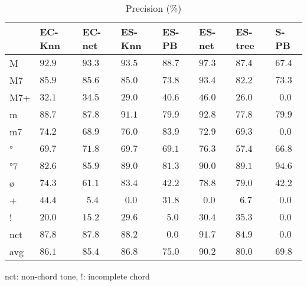 \documentclass{article}
\begin{document}
\begin{table}
  \centering
  \begin{tabular}{l|p{.5cm}p{.5cm}p{.5cm}p{.5cm}p{.5cm}p{.5cm}p{.5cm}}
   & EC-Knn&EC-net &ES-Knn &ES-PB  &ES-net &ES-tree&S-PB     \\
\hline                                             
M  &$ 92.9$&$ 93.3$&$ 93.5$&$ 88.7$&$ 97.3$&$ 87.4$&$ 67.4$  \\
M7 &$ 85.9$&$ 85.6$&$ 85.0$&$ 73.8$&$ 93.4$&$ 82.2$&$ 73.3$  \\
M7+&$ 32.1$&$ 34.5$&$ 29.0$&$ 40.6$&$ 46.0$&$ 26.0$&$~~0.0$  \\
m  &$ 88.7$&$ 87.8$&$ 91.1$&$ 79.9$&$ 92.8$&$ 77.8$&$ 79.9$  \\
m7 &$ 74.2$&$ 68.9$&$ 76.0$&$ 83.9$&$ 72.9$&$ 69.3$&$~~0.0$  \\
°  &$ 69.7$&$ 71.8$&$ 69.7$&$ 69.1$&$ 76.3$&$ 57.4$&$ 66.8$  \\
°7 &$ 82.6$&$ 85.9$&$ 89.0$&$ 81.3$&$ 90.0$&$ 89.1$&$ 94.6$  \\
ø  &$ 74.3$&$ 61.1$&$ 83.4$&$ 42.2$&$ 78.8$&$ 79.0$&$ 42.2$  \\
+  &$ 44.4$&$~~5.4$&$~~0.0$&$ 31.8$&$~~0.0$&$~~6.7$&$~~0.0$  \\
!  &$ 20.0$&$ 15.2$&$ 29.6$&$~~5.0$&$ 30.4$&$ 35.3$&$~~0.0$  \\
nct&$ 87.8$&$ 87.8$&$ 88.2$&$~~0.0$&$ 91.7$&$ 84.9$&$~~0.0$  \\
avg&$ 86.1$&$ 85.4$&$ 86.8$&$ 75.0$&$ 90.2$&$ 80.0$&$ 69.8$  \\

  \end{tabular}

\medskip

nct: non-chord tone, !: incomplete chord

  \caption{Precision (\%)}
  \label{tab:precision}
\end{table}
\end{document}
